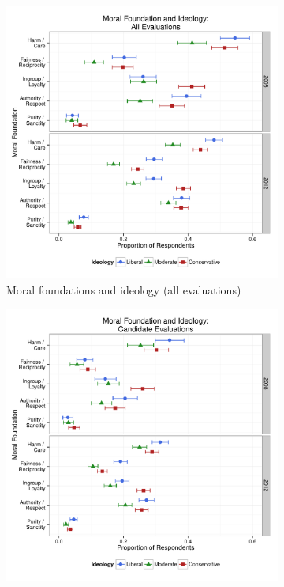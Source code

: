 \documentclass[12pt]{article}
\begin{document}
\begin{figure}[h]
  \centering
  \caption{INSERT DESCRIPTION}
  \begin{subfigure}[t]{0.49\textwidth}
    \includegraphics[scale=.35]{../calc/fig/appC1prop.pdf}
\caption{Moral foundations and ideology (all evaluations)}\label{fig:appC1prop}
  \end{subfigure}
  \begin{subfigure}[t]{0.49\textwidth}
    \includegraphics[scale=.35]{../calc/fig/appC2cand.pdf}

\end{subfigure}
\end{figure}
\end{document}
